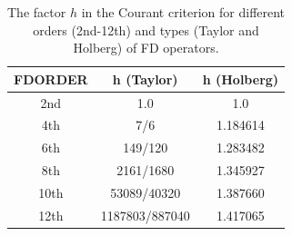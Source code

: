 \begin{table}[hbt]
\caption{\label{courant.1} The factor $h$ in the Courant criterion for different orders (2nd-12th) and types (Taylor and Holberg) of FD operators.}
\centering
\begin{tabular}{c|c|c}
\textbf{FDORDER} & \textbf{h (Taylor)}      & \textbf{h (Holberg)} \\ \hline
2nd   &   1.0             &  1.0        \\
4th   &   7/6             &  1.184614   \\
6th   &   149/120         &  1.283482   \\
8th   &   2161/1680       &  1.345927   \\
10th  &   53089/40320     &  1.387660   \\
12th  &   1187803/887040  &  1.417065    
\end{tabular}
\end{table} 
